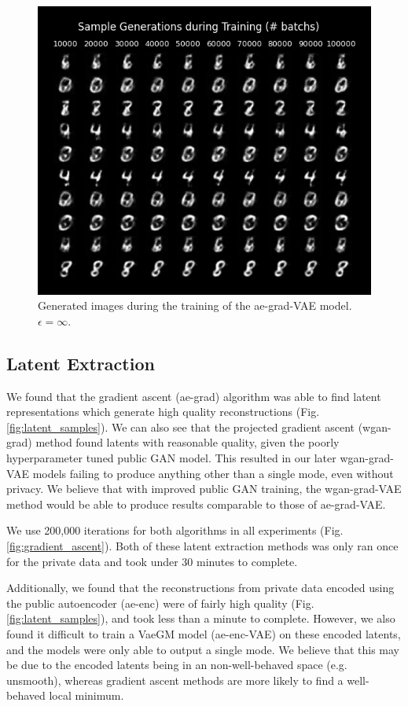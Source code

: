 \documentclass{article}
\begin{document}
\begin{figure}[!h]
    \centering
    \includegraphics[width=0.6\columnwidth]{images/during_train_inf.png}
    \caption{Generated images during the training of the ae-grad-VAE model. $\epsilon = \infty$.}
    \label{fig:during_train_inf}
\end{figure}

\subsection{Latent Extraction}
We found that the gradient ascent (ae-grad) algorithm was able to find latent representations which generate high quality reconstructions (Fig. \ref{fig:latent_samples}). We can also see that the projected gradient ascent (wgan-grad) method found latents with reasonable quality, given the poorly hyperparameter tuned public GAN model. This resulted in our later wgan-grad-VAE models failing to produce anything other than a single mode, even without privacy. We believe that with improved public GAN training, the wgan-grad-VAE method would be able to produce results comparable to those of ae-grad-VAE.

We use 200,000 iterations for both algorithms in all experiments (Fig. \ref{fig:gradient_ascent}). Both of these latent extraction methods was only ran once for the private data and took under 30 minutes to complete.

Additionally, we found that the reconstructions from private data encoded using the public autoencoder (ae-enc) were of fairly high quality (Fig. \ref{fig:latent_samples}), and took less than a minute to complete. However, we also found it difficult to train a VaeGM model (ae-enc-VAE) on these encoded latents, and the models were only able to output a single mode. We believe that this may be due to the encoded latents being in an non-well-behaved space (e.g. unsmooth), whereas gradient ascent methods are more likely to find a well-behaved local minimum. 
\end{document}
